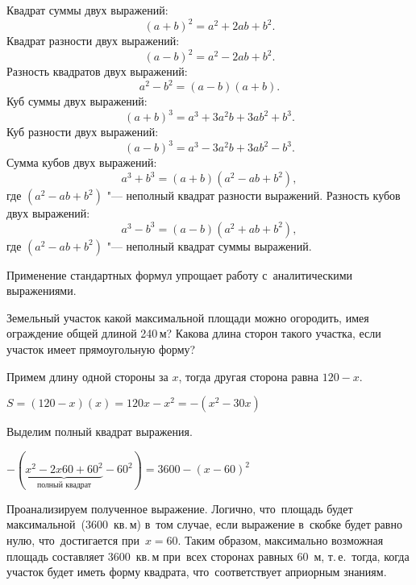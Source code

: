 \documentclass[]{scrartcl}
\begin{document}
Квадрат суммы двух выражений:
\begin{equation}\label{eq:simple-multipl-of-polynomials-1}
(a+b)^2=a^2+2ab+b^2.
\end{equation}
Квадрат разности двух выражений:
\begin{equation}\label{eq:simple-multipl-of-polynomials-2}
(a-b)^2=a^2-2ab+b^2.
\end{equation}
Разность квадратов двух выражений:
\begin{equation}\label{eq:simple-multipl-of-polynomials-3}
a^2-b^2 = (a-b)(a+b).
\end{equation}
Куб суммы двух выражений:
\begin{equation}\label{eq:simple-multipl-of-polynomials-4}
(a+b)^3 = a^3 + 3a^{2}b+3ab^{2}+b^3.
\end{equation}
Куб разности двух выражений:
\begin{equation}\label{eq:simple-multipl-of-polynomials-5}
(a-b)^3 = a^3 - 3a^{2}b+3ab^{2}-b^3.
\end{equation}
Сумма кубов двух выражений:
\begin{equation}\label{eq:simple-multipl-of-polynomials-6}
a^3+b^3=(a+b)(a^2-ab+b^2),
\end{equation}
где $(a^2-ab+b^2)$ "--- неполный квадрат разности выражений.
Разность кубов двух выражений:
\begin{equation}\label{eq:simple-multipl-of-polynomials-7}
a^3-b^3=(a-b)(a^2+ab+b^2),
\end{equation}
где $(a^2-ab+b^2)$ "--- неполный квадрат суммы выражений.

Применение стандартных формул упрощает работу с~аналитическими выражениями.

\begin{Thexmpl}\label{ex:full-square}
	Земельный участок какой максимальной площади можно огородить, имея ограждение общей длиной 240\,м? Какова длина сторон такого участка, если участок имеет прямоугольную форму? 
	
	Примем длину одной стороны за $x$, тогда другая сторона равна $120-x$.
	
	$S=(120-x)(x)=120x-x^2=-(x^2-30x)$
	
	Выделим полный квадрат выражения.
	
	$-(\underbrace{x^2-2x60+60^2}_{\text{полный квадрат}}-60^2)=3600-(x-60)^2$
	
	Проанализируем полученное выражение. Логично, что~площадь будет максимальной~(3600~кв.\,м) в~том случае, если выражение в~скобке будет равно нулю, что~достигается при~$x=60$. Таким образом, максимально возможная площадь составляет 3600~кв.\,м при~всех сторонах равных 60~м, т.\,е.~тогда, когда участок будет иметь форму квадрата, что~соответствует априорным знаниям.
\end{Thexmpl}
\end{document}
